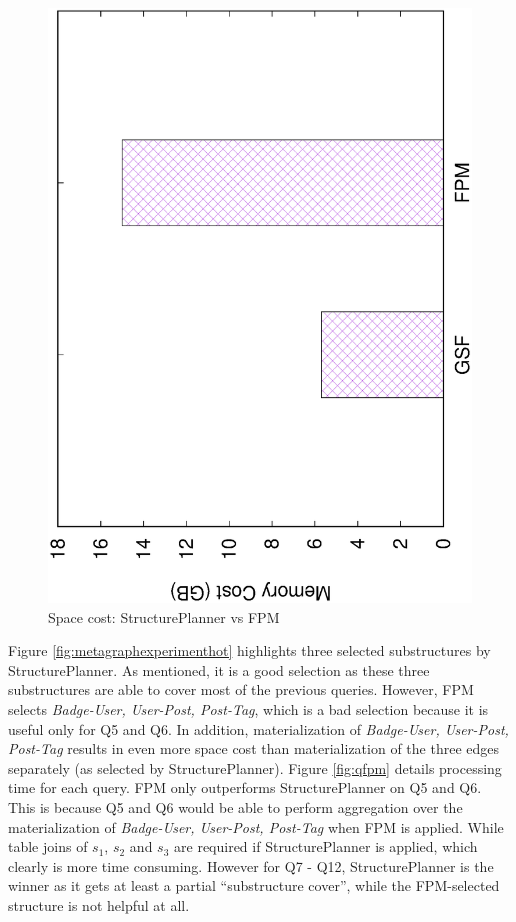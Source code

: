 \begin{figure}[H]
	\centering
	\includegraphics[scale=0.43, angle=270]{plot/fpm_space.eps}
	\caption{Space cost: StructurePlanner vs FPM}
	\label{fig:fpmspace}
\end{figure}

Figure \ref{fig:metagraphexperimenthot} highlights three selected substructures by StructurePlanner. As mentioned, it is a good selection as these three substructures are able to cover most of the previous queries. However, FPM selects \textit{Badge-User, User-Post, Post-Tag}, which is a bad selection because it is useful only for Q5 and Q6. In addition, materialization of \textit{Badge-User, User-Post, Post-Tag} results in even more space cost than materialization of the three edges separately (as selected by StructurePlanner). Figure \ref{fig:qfpm} details processing time for each query. FPM only outperforms StructurePlanner on Q5 and Q6. This is because Q5 and Q6 would be able to perform aggregation over the materialization of \textit{Badge-User, User-Post, Post-Tag} when FPM is applied. While table joins of $s_1$, $s_2$ and $s_3$ are required if StructurePlanner is applied, which clearly is more time consuming. However for Q7 - Q12, StructurePlanner is the winner as it gets at least a partial ``substructure cover'', while the FPM-selected structure is not helpful at all.

